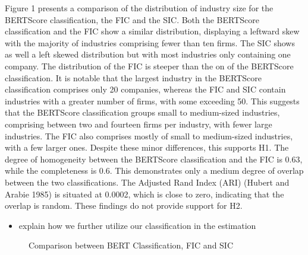 \documentclass[
]{article}
\providecommand{\tightlist}{%
  \setlength{\itemsep}{0pt}\setlength{\parskip}{0pt}}\usepackage{longtable,booktabs,array}
\begin{document}
Figure 1 presents a comparison of the distribution of industry size for
the BERTScore classification, the FIC and the SIC. Both the BERTScore
classification and the FIC show a similar distribution, displaying a
leftward skew with the majority of industries comprising fewer than ten
firms. The SIC shows as well a left skewed distribution but with most
industries only containing one company. The distribution of the FIC is
steeper than the on of the BERTScore classification. It is notable that
the largest industry in the BERTScore classification comprises only 20
companies, whereas the FIC and SIC contain industries with a greater
number of firms, with some exceeding 50. This suggests that the
BERTScore classification groups small to medium-sized industries,
comprising between two and fourteen firms per industry, with fewer large
industries. The FIC also comprises mostly of small to medium-sized
industries, with a few larger ones. Despite these minor differences,
this supports H1. The degree of homogeneity between the BERTScore
classification and the FIC is 0.63, while the completeness is 0.6. This
demonstrates only a medium degree of overlap between the two
classifications. The Adjusted Rand Index (ARI) (Hubert and Arabie 1985)
is situated at 0.0002, which is close to zero, indicating that the
overlap is random. These findings do not provide support for H2.

\begin{itemize}
\tightlist
\item
  explain how we further utilize our classification in the estimation
\end{itemize}

\begin{figure}


\caption{\label{fig-1}Comparison between BERT Classification, FIC and
SIC}

\end{figure}%
\end{document}
